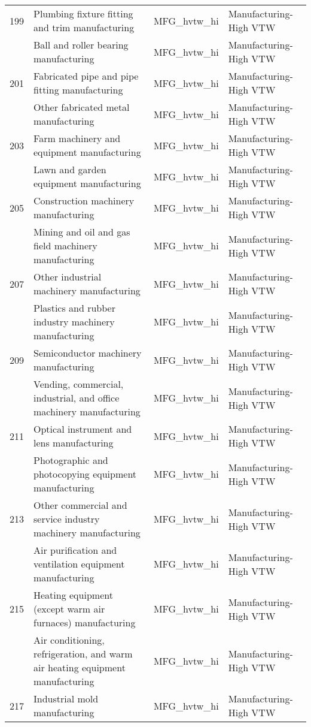 \begin{landscape}
\begin{small}
\begin{longtable}{clll}
199 & Plumbing fixture fitting and trim manufacturing & MFG\_hvtw\_hi & Manufacturing-High VTW \\
\gray 200 & Ball and roller bearing manufacturing & MFG\_hvtw\_hi & Manufacturing-High VTW \\
201 & Fabricated pipe and pipe fitting manufacturing & MFG\_hvtw\_hi & Manufacturing-High VTW \\
\gray 202 & Other fabricated metal manufacturing & MFG\_hvtw\_hi & Manufacturing-High VTW \\
203 & Farm machinery and equipment manufacturing & MFG\_hvtw\_hi & Manufacturing-High VTW \\
\gray 204 & Lawn and garden equipment manufacturing & MFG\_hvtw\_hi & Manufacturing-High VTW \\
205 & Construction machinery manufacturing & MFG\_hvtw\_hi & Manufacturing-High VTW \\
\gray 206 & Mining and oil and gas field machinery manufacturing & MFG\_hvtw\_hi & Manufacturing-High VTW \\
207 & Other industrial machinery manufacturing & MFG\_hvtw\_hi & Manufacturing-High VTW \\
\gray 208 & Plastics and rubber industry machinery manufacturing & MFG\_hvtw\_hi & Manufacturing-High VTW \\
209 & Semiconductor machinery manufacturing & MFG\_hvtw\_hi & Manufacturing-High VTW \\
\gray 210 & Vending, commercial, industrial, and office machinery manufacturing & MFG\_hvtw\_hi & Manufacturing-High VTW \\
211 & Optical instrument and lens manufacturing & MFG\_hvtw\_hi & Manufacturing-High VTW \\
\gray 212 & Photographic and photocopying equipment manufacturing & MFG\_hvtw\_hi & Manufacturing-High VTW \\
213 & Other commercial and service industry machinery manufacturing & MFG\_hvtw\_hi & Manufacturing-High VTW \\
\gray 214 & Air purification and ventilation equipment manufacturing & MFG\_hvtw\_hi & Manufacturing-High VTW \\
215 & Heating equipment (except warm air furnaces) manufacturing & MFG\_hvtw\_hi & Manufacturing-High VTW \\
\gray 216 & Air conditioning, refrigeration, and warm air heating equipment manufacturing & MFG\_hvtw\_hi & Manufacturing-High VTW \\
217 & Industrial mold manufacturing & MFG\_hvtw\_hi & Manufacturing-High VTW \\

\end{longtable}
\end{small}
\end{landscape}
